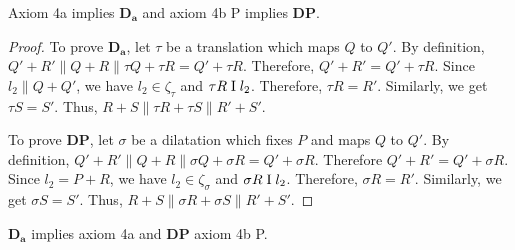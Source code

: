 \begin{theorem}
    Axiom 4a implies $\mathbf{D_a}$ and axiom 4b P implies $\mathbf{DP}$.
\end{theorem}

\begin{proof}
    To prove $\mathbf{D_a}$, let $\tau$ be a translation which maps $Q$ to $Q'$. By definition, $Q'+R' \parallel Q+R \parallel \tau Q + \tau R = Q' + \tau R$. Therefore, $Q'+ R' = Q'+\tau R$. Since $l_2 \parallel Q+Q'$, we have $l_2 \in \zeta_\tau$ and $\tau R \mathrel\text{I} l_2$. Therefore, $\tau R=R'$. Similarly, we get $\tau S = S'$. Thus, $R+S \parallel \tau R + \tau S \parallel R'+S'$.

    \vspace{1ex}

    To prove $\mathbf{DP}$, let $\sigma$ be a dilatation which fixes $P$ and maps $Q$ to $Q'$. By definition, $Q'+R' \parallel Q+R \parallel \sigma Q + \sigma R = Q' + \sigma R$. Therefore $Q'+ R' = Q'+\sigma R$. Since $l_2 = P+R$, we have $l_2 \in \zeta_\sigma$ and $\sigma R \mathrel\text{I} l_2$. Therefore, $\sigma R=R'$. Similarly, we get $\sigma S = S'$. Thus, $R+S \parallel \sigma R + \sigma S \parallel R'+S'$.
\end{proof}

\begin{theorem}
    $\mathbf{D_a}$ implies axiom 4a and $\mathbf{DP}$ axiom 4b P. 
\end{theorem}

